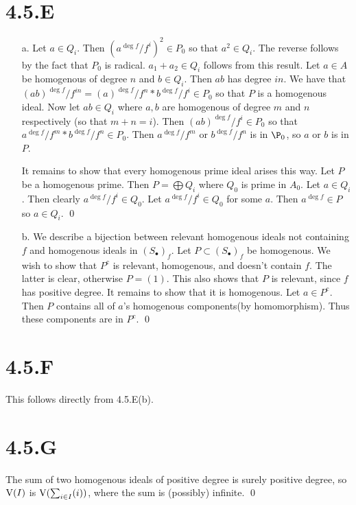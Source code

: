 \documentclass{article}
\begin{document}
\section{4.5.E}
\begin{itemize}
    \item[a.]
          Let $a \in Q_i$. Then $(a^{\deg f}/f^i)^2 \in P_0$ so that
          $a^2 \in Q_i$. The reverse follows by the fact that
          $P_0$ is radical. $a_1+a_2 \in Q_i$ follows from this
          result. Let $a \in A$ be homogenous of degree
          $n$ and $b \in Q_i$. Then $ab$
          has degree $in$. We have that $(ab)^{\deg f}/f^{in}=(a)^{\deg f}/f^{n}*b^{\deg f}/f^{i} \in P_0$ so that
          $P$ is a homogenous ideal. Now let $ab \in Q_i$
          where $a, b$ are homogenous of degree $m$
          and $n$ respectively (so that $m+n=i$). Then
          $(ab)^{\deg f}/f^{i} \in P_0$ so that $a^{\deg f}/f^{m}*b^{\deg f}/f^{n} \in P_0$. Then
          $a^{\deg f}/f^{m}$ or $b^{\deg f}/f^{n}$ is in $\P_0$,
          so $a$ or $b$ is in
          $P$.

          It remains to show that every homogenous prime ideal arises this way. Let
          $P$ be a homogenous prime. Then $P=\bigoplus Q_i$ where
          $Q_0$ is prime in $A_0$. Let
          $a \in Q_i$. Then clearly $a^{\deg f}/f^{i} \in Q_0$. Let
          $a^{\deg f}/f^{i} \in Q_0$ for some $a$. Then
          $a^{\deg f} \in P$ so $a \in Q_i$. \qed

    \item[b.] We describe a bijection between relevant homogenous ideals not containing
          $f$ and homogenous ideals in $(S_{\bullet})_f$. Let
          $P \subset (S_{\bullet})_f$ be homogenous. We wish to show that
          $P^{\text{c}}$ is relevant, homogenous, and doesn't contain
          $f$. The latter is clear, otherwise $P=(1)$.
          This also shows that $P$ is relevant, since
          $f$ has positive degree. It remains to show that it is
          homogenous. Let $a \in P^{\text{c}}$. Then $P$ contains
          all of $a$'s homogenous components(by homomorphism). Thus
          these components are in $P^{\text{c}}$. \qed
\end{itemize}

\section{4.5.F}
This follows directly from 4.5.E(b).

\section{4.5.G}
The sum of two homogenous ideals of positive degree is surely positive degree,
so $\operatorname{V}(I)$ is $\operatorname{V}(\sum_{i \in I} (i))$, where the sum is
(possibly) infinite. \qed
\end{document}

